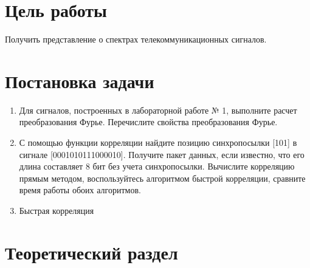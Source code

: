 \documentclass[a4paper]{article}
\begin{document}
\tableofcontents
\newpage
\section{Цель работы}
Получить представление о спектрах телекоммуникационных сигналов.
\section{Постановка задачи}
\begin{enumerate}
    \item Для сигналов, построенных в лабораторной работе № 1, выполните расчет преобразования Фурье. Перечислите свойства преобразования Фурье.
    \item С помощью функции корреляции найдите позицию синхропосылки [101] в сигнале [0001010111000010]. Получите пакет данных, если известно, что его длина составляет 8 бит без учета синхропосылки. Вычислите корреляцию прямым методом, воспользуйтесь алгоритмом быстрой корреляции, сравните время работы обоих алгоритмов.
    \item Быстрая корреляция
\end{enumerate}
\section{Теоретический раздел}
\end{document}
